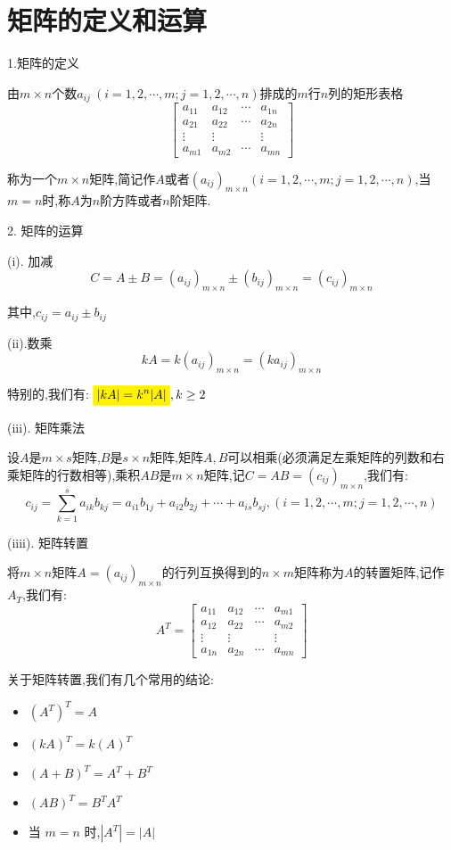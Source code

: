 \section{矩阵的定义和运算}
\begin{definition}[矩阵的定义和运算]
	1.矩阵的定义
	
	由$m\times n$个数$a_{ij}\ (i=1,2,\cdots,m;j=1,2,\cdots,n)$排成的$m$行$n$列的矩形表格
	$$\left[
	\begin{matrix}
		a_{11}&a_{12}&\cdots&a_{1n}\\
		a_{21}&a_{22}&\cdots&a_{2n}\\
		\vdots&\vdots& &\vdots\\
		a_{m1}&a_{m2}&\cdots&a_{mn}
	\end{matrix}
		\right]$$
		
		称为一个$m\times n$矩阵,简记作$A$或者$(a_{ij})_{m\times n} (i=1,2,\cdots,m;j=1,2,\cdots,n)$,当$m=n$时,称$A$为$n$阶方阵或者$n$阶矩阵.
		
	2. 矩阵的运算
	
	(i). 加减
	$$C=A\pm B=(a_{ij})_{m\times n}\pm (b_{ij})_{m\times n}=(c_{ij})_{m\times n}$$
	
	其中,$c_{ij}=a_{ij}\pm b_{ij}$
	
	(ii).数乘
	$$kA=k(a_{ij})_{m\times n}=(ka_{ij})_{m\times n}$$
	
	特别的,我们有:  $\mathcolorbox{yellow}{|kA|=k^{n}|A|},k\geq 2$
	
	(iii). 矩阵乘法
	
	设$A$是$m\times s$矩阵,$B$是$s\times n$矩阵,矩阵$A,B$可以相乘(必须满足左乘矩阵的列数和右乘矩阵的行数相等),乘积$AB$是$m\times n$矩阵,记$C=AB=(c_{ij})_{m\times n}$,我们有:  
	$$c_{ij}=\sum\limits_{k=1}^{s}a_{ik}b_{kj}=a_{i1}b_{1j}+a_{i2}b_{2j}+\cdots+a_{is}b_{sj},(i=1,2,\cdots,m;j=1,2,\cdots,n)$$
	
	(iiii). 矩阵转置
	
	将$m\times n$矩阵$A=(a_{ij})_{m\times n}$的行列互换得到的$n\times m$矩阵称为$A$的转置矩阵,记作$A_{T}$,我们有:  
	$$A^{T}=\left[
	\begin{matrix}
		a_{11}&a_{12}&\cdots&a_{m1}\\
		a_{12}&a_{22}&\cdots&a_{m2}\\
		\vdots&\vdots& &\vdots\\
		a_{1n}&a_{2n}&\cdots&a_{mn}
	\end{matrix}
	\right]$$
	
	关于矩阵转置,我们有几个常用的结论:  
	\begin{itemize}
		\item $(A^{T})^{T}=A$
		\item $(kA)^{T}=k(A)^{T}$
		\item $(A+B)^{T}=A^{T}+B^{T}$
		\item $(AB)^{T}=B^{T}A^{T}$
		\item 当 $m=n$ 时,$|A^{T}|=|A|$
	\end{itemize}
	

\end{definition}
